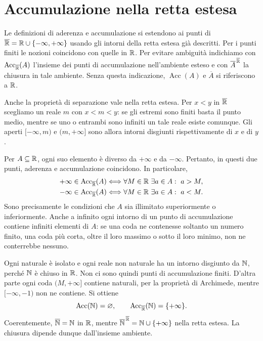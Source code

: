 \section{Accumulazione nella retta estesa}

Le definizioni di aderenza e accumulazione si estendono ai punti di $\overline{\mathbb{R}}=\mathbb{R}\cup\{-\infty,+\infty\}$ usando gli intorni della retta estesa già descritti. Per i punti finiti le nozioni coincidono con quelle in $\mathbb{R}$. Per evitare ambiguità indichiamo con $\operatorname{Acc}_{\overline{\mathbb{R}}}(A)$ l'insieme dei punti di accumulazione nell'ambiente esteso e con $\overline A^{\,\overline{\mathbb{R}}}$ la chiusura in tale ambiente. Senza questa indicazione, $\operatorname{Acc}(A)$ e $\overline A$ si riferiscono a $\mathbb{R}$.

Anche la proprietà di separazione vale nella retta estesa. Per $x<y$ in $\overline{\mathbb{R}}$ scegliamo un reale $m$ con $x<m<y$: se gli estremi sono finiti basta il punto medio, mentre se uno o entrambi sono infiniti un tale reale esiste comunque. Gli aperti $[-\infty,m)$ e $(m,+\infty]$ sono allora intorni disgiunti rispettivamente di $x$ e di $y$.

Per $A\subseteq\mathbb{R}$, ogni suo elemento è diverso da $+\infty$ e da $-\infty$. Pertanto, in questi due punti, aderenza e accumulazione coincidono. In particolare,
\[
\begin{aligned}
+\infty\in\operatorname{Acc}_{\overline{\mathbb{R}}}(A)
&\Longleftrightarrow \forall M\in\mathbb{R}\ \exists a\in A:\ a>M,\\
-\infty\in\operatorname{Acc}_{\overline{\mathbb{R}}}(A)
&\Longleftrightarrow \forall M\in\mathbb{R}\ \exists a\in A:\ a<M.
\end{aligned}
\]
Sono precisamente le condizioni che $A$ sia illimitato superiormente o inferiormente. Anche a infinito ogni intorno di un punto di accumulazione contiene infiniti elementi di $A$: se una coda ne contenesse soltanto un numero finito, una coda più corta, oltre il loro massimo o sotto il loro minimo, non ne conterrebbe nessuno.

\begin{esempio}
Ogni naturale è isolato e ogni reale non naturale ha un intorno disgiunto da $\mathbb{N}$, perché $\mathbb{N}$ è chiuso in $\mathbb{R}$. Non ci sono quindi punti di accumulazione finiti. D'altra parte ogni coda $(M,+\infty]$ contiene naturali, per la proprietà di Archimede, mentre $[-\infty,-1)$ non ne contiene. Si ottiene
\[
\operatorname{Acc}(\mathbb{N})=\varnothing,\qquad
\operatorname{Acc}_{\overline{\mathbb{R}}}(\mathbb{N})=\{+\infty\}.
\]
Coerentemente, $\overline{\mathbb{N}}=\mathbb{N}$ in $\mathbb{R}$, mentre $\overline{\mathbb{N}}^{\,\overline{\mathbb{R}}}=\mathbb{N}\cup\{+\infty\}$ nella retta estesa. La chiusura dipende dunque dall'insieme ambiente.
\end{esempio}

